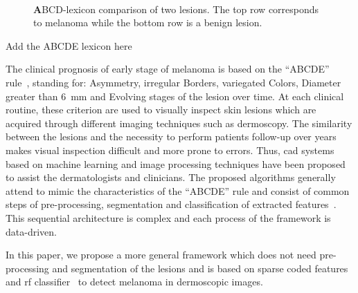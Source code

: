 \begin{figure}
\begin{center}
    \hfill
    \hfill
    \hfill
  \hspace*{\fill}\\
    \caption{{\textbf ABCD}-lexicon comparison of two lesions. The top row corresponds to melanoma while the bottom row is a benign lesion.}
  \label{fig:lexicon}
\end{center}
\end{figure}
{\color{red}Add the ABCDE lexicon here}

The clinical prognosis of early stage of melanoma is based on the ``ABCDE'' rule~\cite{abbasi2004early}, standing for: Asymmetry, irregular Borders, variegated Colors, Diameter greater than \SI{6}{\milli \meter} and Evolving stages of the lesion over time.
At each clinical routine, these criterion are used to visually inspect skin lesions which are acquired through different imaging techniques such as dermoscopy.
The similarity between the lesions and the necessity to perform patients follow-up over years makes visual inspection difficult and more prone to errors.
Thus, \ac{cad} systems based on machine learning and image processing techniques have been proposed to assist the dermatologists and clinicians.
The proposed algorithms generally attend to mimic the characteristics of the ``ABCDE'' rule and consist of common steps of pre-processing, segmentation and classification of extracted features~\cite{rastgoo2015automatic}.
This sequential architecture is complex and each process of the framework is data-driven.

In this paper, we propose a more general framework which does not need pre-processing and segmentation of the lesions and is based on sparse coded features and \ac{rf} classifier~\cite{breiman2001random} to detect melanoma in dermoscopic images.

